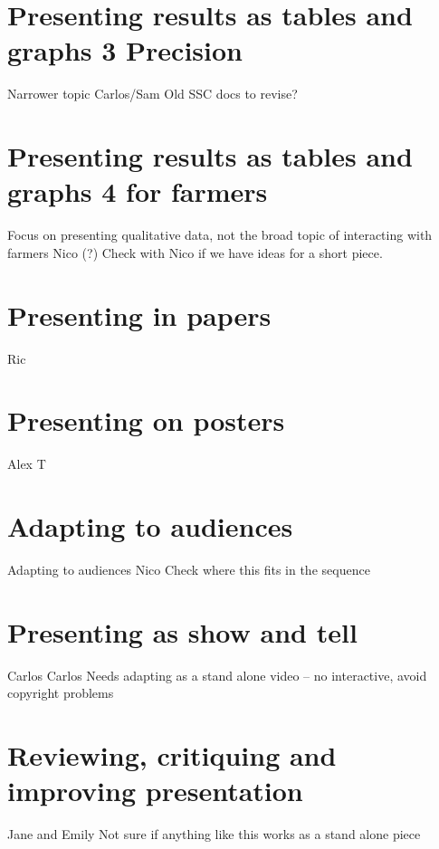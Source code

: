 \documentclass[
]{book}
\begin{document}
\hypertarget{precision}{%
\chapter{Presenting results as tables and graphs 3 Precision}\label{precision}}

Narrower topic Carlos/Sam Old SSC docs to revise?

\hypertarget{farmers}{%
\chapter{Presenting results as tables and graphs 4 for farmers}\label{farmers}}

Focus on presenting qualitative data, not the broad topic of interacting with farmers Nico (?) Check with Nico if we have ideas for a short piece.

\hypertarget{papers}{%
\chapter{Presenting in papers}\label{papers}}

Ric

\hypertarget{posters}{%
\chapter{Presenting on posters}\label{posters}}

Alex T

\hypertarget{audience}{%
\chapter{Adapting to audiences}\label{audience}}

Adapting to audiences Nico Check where this fits in the sequence

\hypertarget{show}{%
\chapter{Presenting as show and tell}\label{show}}

Carlos Carlos Needs adapting as a stand alone video -- no interactive, avoid copyright problems

\hypertarget{review}{%
\chapter{Reviewing, critiquing and improving presentation}\label{review}}

Jane and Emily Not sure if anything like this works as a stand alone piece

  
\end{document}
